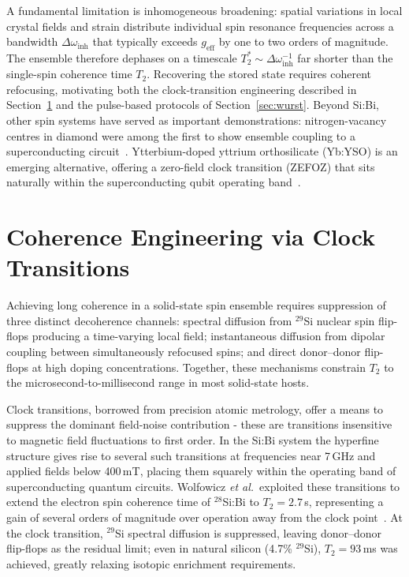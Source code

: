 \documentclass[technote]{IEEEtran}
\begin{document}
A fundamental limitation is inhomogeneous broadening: spatial variations in local crystal fields and strain distribute individual spin resonance frequencies across a bandwidth $\Delta\omega_\mathrm{inh}$ that typically exceeds $g_\mathrm{eff}$ by one to two orders of magnitude. The ensemble therefore dephases on a timescale $T_2^* \sim \Delta\omega_\mathrm{inh}^{-1}$ far shorter than the single-spin coherence time $T_2$. Recovering the stored state requires coherent refocusing, motivating both the clock-transition engineering described in Section~\ref{sec:coherence} and the pulse-based protocols of Section~\ref{sec:wurst}. Beyond Si:Bi, other spin systems have served as important demonstrations: nitrogen-vacancy centres in diamond were among the first to show ensemble coupling to a superconducting circuit~\cite{kubo2010}. Ytterbium-doped yttrium orthosilicate (Yb:YSO) is an emerging alternative, offering a zero-field clock transition (ZEFOZ) that sits naturally within the superconducting qubit operating band~\cite{alexander2022}.

\section{Coherence Engineering via Clock Transitions}
\label{sec:coherence}

Achieving long coherence in a solid-state spin ensemble requires suppression of three distinct decoherence channels: spectral diffusion from $^{29}$Si nuclear spin flip-flops producing a time-varying local field; instantaneous diffusion from dipolar coupling between simultaneously refocused spins; and direct donor--donor flip-flops at high doping concentrations. Together, these mechanisms constrain $T_2$ to the microsecond-to-millisecond range in most solid-state hosts.

Clock transitions, borrowed from precision atomic metrology, offer a means to suppress the dominant field-noise contribution - these are transitions insensitive to magnetic field fluctuations to first order. In the Si:Bi system the hyperfine structure gives rise to several such transitions at frequencies near 7\,GHz and applied fields below 400\,mT, placing them squarely within the operating band of superconducting quantum circuits. Wolfowicz \textit{et al.}\ exploited these transitions to extend the electron spin coherence time of $^{28}$Si:Bi to $T_2 = 2.7$\,s, representing a gain of several orders of magnitude over operation away from the clock point~\cite{wolfowicz2013}. At the clock transition, $^{29}$Si spectral diffusion is suppressed, leaving donor--donor flip-flops as the residual limit; even in natural silicon (4.7\% $^{29}$Si), $T_2 = 93$\,ms was achieved, greatly relaxing isotopic enrichment requirements.
\end{document}
